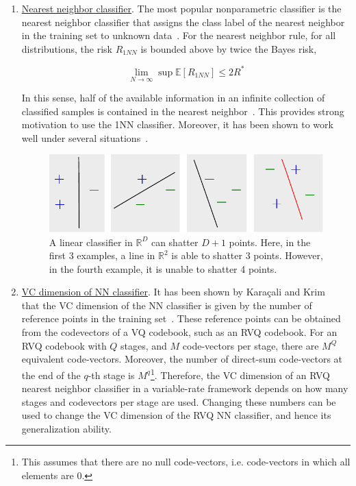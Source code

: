 \begin{enumerate}
\item \underline{Nearest neighbor classifier}.  The most popular nonparametric classifier is the nearest neighbor classifier that assigns the class label of the nearest neighbor in the training set to unknown data~\cite{2003_JNL_PRML_Karacali}.  For the nearest neighbor rule, for all distributions, the risk $R_{1NN}$ is bounded above by twice the Bayes risk,

\begin{equation}
\lim\limits_{N \rightarrow \infty} \sup\mathbb{E}\left[R_{1NN}\right] \leq 2R^*  
\end{equation}

In this sense, half of the available information in an infinite collection of classified samples is contained in the nearest neighbor~\cite{1967_JNL_PRML_Cover}.  This provides strong motivation to use the 1NN classifier.  Moreover, it has been shown to work well under several situations~\cite{1996_BOOK_PR_DevroyeGyorfiLugosi}.

								\begin{figure}[t]
								\centering
								\includegraphics[width=1.0\textwidth]{thesis2/theory_PRML_shattering.pdf}
								\caption{A linear classifier in $\mathbb{R}^D$ can shatter $D+1$ points.  Here, in the first 3 examples, a line in $\mathbb{R}^2$ is able to shatter 3 points.  However, in the fourth example, it is unable to shatter 4 points.}
								\label{fig:shattering}
								\end{figure}

\item \underline{VC dimension of NN classifier}.   It has been shown by Kara\c{c}ali and Krim~\cite{2003_JNL_PRML_Karacali} that the VC dimension of the NN classifier is given by the number of reference points in the training set~\cite{2005_CNF_ML_Angiulli}.  These reference points can be obtained from the codevectors of a VQ codebook, such as an RVQ codebook.  For an RVQ codebook with $Q$ stages, and $M$ code-vectors per stage, there are $M^Q$ equivalent code-vectors.  Moreover, the number of direct-sum code-vectors at the end of the $q$-th stage is $M^q$\footnote{This assumes that there are no null code-vectors, i.e. code-vectors in which all elements are 0.}.   Therefore, the VC dimension of an RVQ nearest neighbor classifier in a variable-rate framework depends on how many stages and codevectors per stage are used.  Changing these numbers can be used to change the VC dimension of the RVQ NN classifier, and hence its generalization ability.  
\end{enumerate}

